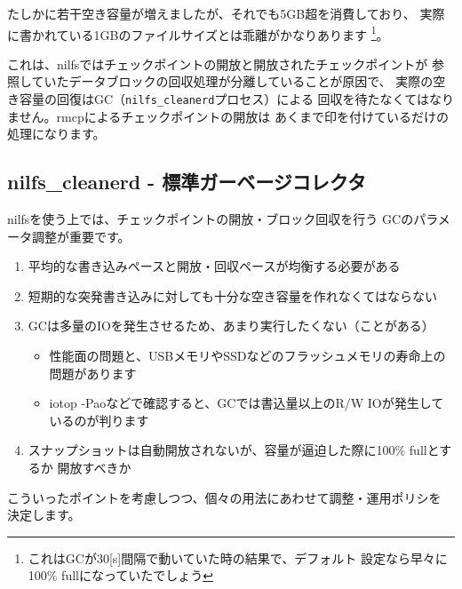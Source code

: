 \documentclass[mingoth,a4paper]{jsarticle}
\begin{document}
たしかに若干空き容量が増えましたが、それでも5GB超を消費しており、
実際に書かれている1GBのファイルサイズとは乖離がかなりあります
\footnote{これはGCが30[s]間隔で動いていた時の結果で、デフォルト
設定なら早々に100\% fullになっていたでしょう}。

これは、nilfsではチェックポイントの開放と開放されたチェックポイントが
参照していたデータブロックの回収処理が分離していることが原因で、
実際の空き容量の回復はGC（\verb|nilfs_cleanerd|プロセス）による
回収を待たなくてはなりません。rmcpによるチェックポイントの開放は
あくまで印を付けているだけの処理になります。

\subsection{nilfs\_cleanerd - 標準ガーベージコレクタ}

nilfsを使う上では、チェックポイントの開放・ブロック回収を行う
GCのパラメータ調整が重要です。
\begin{enumerate}
\item 平均的な書き込みペースと開放・回収ペースが均衡する必要がある
\item 短期的な突発書き込みに対しても十分な空き容量を作れなくてはならない
\item GCは多量のIOを発生させるため、あまり実行したくない（ことがある）
\begin{itemize}
\item
性能面の問題と、USBメモリやSSDなどのフラッシュメモリの寿命上の問題があります
\item
iotop -Paoなどで確認すると、GCでは書込量以上のR/W IOが発生しているのが判ります
\end{itemize}
\item
スナップショットは自動開放されないが、容量が逼迫した際に100\% fullとするか
開放すべきか
\end{enumerate}
こういったポイントを考慮しつつ、個々の用法にあわせて調整・運用ポリシを
決定します。
\end{document}
